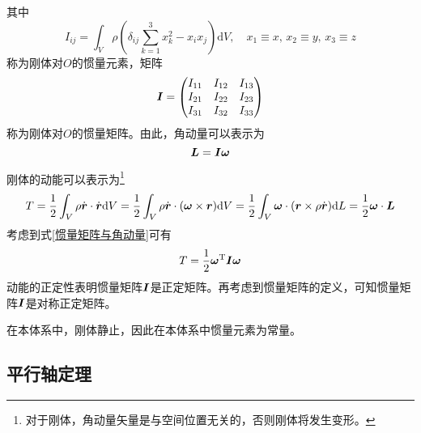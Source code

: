 其中
\begin{equation}
	I_{ij} = \int_V \rho \left(\delta_{ij}\sum_{k=1}^3 x_k^2-x_ix_j\right) \mathrm{d}V,\quad x_1 \equiv x,\,x_2 \equiv y,\,x_3 \equiv z
\end{equation}
称为刚体对$O$的{\heiti 惯量元素}，矩阵
\begin{equation}
	\boldsymbol{I} = \begin{pmatrix} I_{11} & I_{12} & I_{13} \\ I_{21} & I_{22} & I_{23} \\ I_{31} & I_{32} & I_{33} \end{pmatrix}
\end{equation}
称为刚体对$O$的{\heiti 惯量矩阵}。由此，角动量可以表示为
\begin{equation}
	\boldsymbol{L} = \boldsymbol{I} \boldsymbol{\omega}
	\label{惯量矩阵与角动量}
\end{equation}

刚体的动能可以表示为\footnote{对于刚体，角动量矢量是与空间位置无关的，否则刚体将发生变形。}
\begin{equation*}
	T = \frac12 \int_V \rho \dot{\boldsymbol{r}} \cdot \dot{\boldsymbol{r}} \mathrm{d} V = \frac12 \int_V \rho \dot{\boldsymbol{r}} \cdot (\boldsymbol{\omega} \times \boldsymbol{r}) \mathrm{d} V = \frac12 \int_V \boldsymbol{\omega} \cdot (\boldsymbol{r} \times \rho \dot{\boldsymbol{r}}) \mathrm{d} L = \frac12 \boldsymbol{\omega} \cdot \boldsymbol{L}
\end{equation*}
考虑到式\eqref{惯量矩阵与角动量}可有
\begin{equation}
	T = \frac12 \boldsymbol{\omega}^{\mathrm{T}} \boldsymbol{I} \boldsymbol{\omega}
\end{equation}
动能的正定性表明惯量矩阵$\boldsymbol{I}$是正定矩阵。再考虑到惯量矩阵的定义，可知惯量矩阵$\boldsymbol{I}$是对称正定矩阵。

在本体系中，刚体静止，因此在本体系中惯量元素为常量。

\subsection{平行轴定理}


